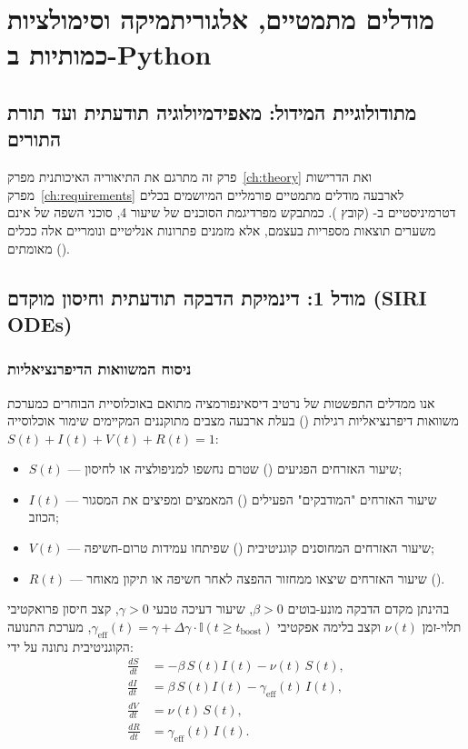 \chapter{מודלים מתמטיים, אלגוריתמיקה וסימולציות כמותיות ב-Python}
\label{ch:math}

\section{מתודולוגיית המידול: מאפידמיולוגיה תודעתית ועד תורת התורים}
פרק זה מתרגם את התיאוריה האיכותנית מפרק~\ref{ch:theory} ואת הדרישות מפרק~\ref{ch:requirements} לארבעה מודלים מתמטיים פורמליים המיושמים בכלים דטרמיניסטיים ב- (קובץ ). כמתבקש מפרדיגמת הסוכנים של שיעור 4, סוכני השפה של  אינם משערים תוצאות מספריות בעצמם, אלא מזמנים פתרונות אנליטיים ונומריים אלה ככלים מאומתים ().

\section{מודל 1: דינמיקת הדבקה תודעתית וחיסון מוקדם (SIRI ODEs)}
\subsection{ניסוח המשוואות הדיפרנציאליות}
אנו ממדלים התפשטות של נרטיב דיסאינפורמציה מתואם באוכלוסיית הבוחרים כמערכת משוואות דיפרנציאליות רגילות () בעלת ארבעה מצבים מתוקננים המקיימים שימור אוכלוסייה $S(t) + I(t) + V(t) + R(t) = 1$:
\begin{itemize}
    \item $S(t)$ — שיעור האזרחים הפגיעים () שטרם נחשפו למניפולציה או לחיסון;
    \item $I(t)$ — שיעור האזרחים "המודבקים" הפעילים () המאמצים ומפיצים את המסגור הכוזב;
    \item $V(t)$ — שיעור האזרחים המחוסנים קוגניטיבית () שפיתחו עמידות טרום-חשיפה;
    \item $R(t)$ — שיעור האזרחים שיצאו ממחזור ההפצה לאחר חשיפה או תיקון מאוחר ().
\end{itemize}

בהינתן מקדם הדבקה מונע-בוטים $\beta > 0$, שיעור דעיכה טבעי $\gamma > 0$, קצב חיסון פרואקטיבי תלוי-זמן $\nu(t)$ וקצב בלימה אפקטיבי $\gamma_{\text{eff}}(t) = \gamma + \Delta\gamma \cdot \mathbb{I}(t \ge t_{\text{boost}})$, מערכת התנועה הקוגניטיבית נתונה על ידי:
\begin{align}
    \frac{dS}{dt} &= -\beta\,S(t)I(t) - \nu(t)\,S(t), \label{eq:siri_ds} \\
    \frac{dI}{dt} &= \beta\,S(t)I(t) - \gamma_{\text{eff}}(t)\,I(t), \label{eq:siri_di} \\
    \frac{dV}{dt} &= \nu(t)\,S(t), \label{eq:siri_dv} \\
    \frac{dR}{dt} &= \gamma_{\text{eff}}(t)\,I(t). \label{eq:siri_dr}
\end{align}

